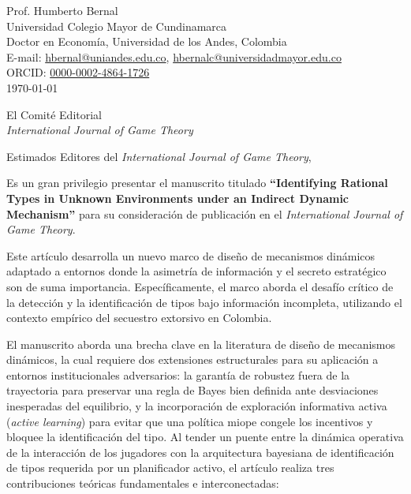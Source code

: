 \documentclass[12pt]{article}
\begin{document}
\singlespacing

\begin{flushright}
Prof. Humberto Bernal \\
Universidad Colegio Mayor de Cundinamarca \\
Doctor en Economía, Universidad de los Andes, Colombia \\
E-mail: \href{mailto:hbernal@uniandes.edu.co}{hbernal@uniandes.edu.co}, \href{mailto:hbernalc@universidadmayor.edu.co}{hbernalc@universidadmayor.edu.co} \\
ORCID: \href{https://orcid.org/0000-0002-4864-1726}{0000-0002-4864-1726} \\
\today
\end{flushright}

\vspace{1.5em}

\begin{flushleft}
El Comité Editorial \\
\textit{International Journal of Game Theory}
\end{flushleft}

\vspace{1.5em}

\noindent Estimados Editores del \textit{International Journal of Game Theory},

\vspace{1.5em}

\noindent Es un gran privilegio presentar el manuscrito titulado \textbf{``Identifying Rational Types in Unknown Environments under an Indirect Dynamic Mechanism''} para su consideración de publicación en el \textit{International Journal of Game Theory}.

Este artículo desarrolla un nuevo marco de diseño de mecanismos dinámicos adaptado a entornos donde la asimetría de información y el secreto estratégico son de suma importancia. Específicamente, el marco aborda el desafío crítico de la detección y la identificación de tipos bajo información incompleta, utilizando el contexto empírico del secuestro extorsivo en Colombia.

El manuscrito aborda una brecha clave en la literatura de diseño de mecanismos dinámicos, la cual requiere dos extensiones estructurales para su aplicación a entornos institucionales adversarios: la garantía de robustez fuera de la trayectoria para preservar una regla de Bayes bien definida ante desviaciones inesperadas del equilibrio, y la incorporación de exploración informativa activa (\textit{active learning}) para evitar que una política miope congele los incentivos y bloquee la identificación del tipo. Al tender un puente entre la dinámica operativa de la interacción de los jugadores con la arquitectura bayesiana de identificación de tipos requerida por un planificador activo, el artículo realiza tres contribuciones teóricas fundamentales e interconectadas:
\end{document}
